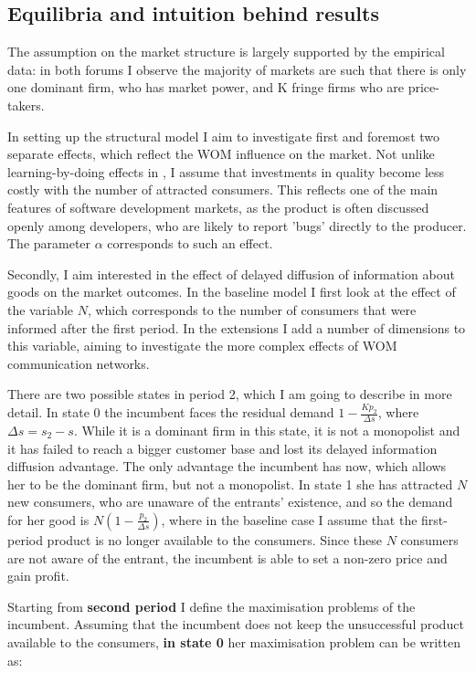 \documentclass{article}
\numberwithin{figure}{section}
\numberwithin{table}{section}
\theoremstyle{indented}
\numberwithin{equation}{section} %
\begin{document}
\subsection{Equilibria and intuition behind results}

The assumption on the market structure is largely supported by the empirical data: in both forums I observe the majority of markets are such that there is only one dominant firm, who has market power, and K fringe firms who are price-takers. 

In setting up the structural model I aim to investigate first and foremost two separate effects, which reflect the WOM influence on the market. Not unlike learning-by-doing effects in \citet{Tirole}, I assume that investments in quality become less costly with the number of attracted consumers. This reflects one of the main features of software development markets, as the product is often discussed openly among developers, who are likely to report 'bugs' directly to the producer. The parameter $\alpha$ corresponds to such an effect. 
 
Secondly, I aim interested in the effect of delayed diffusion of information about goods on the market outcomes. In the baseline model I first look at the effect of the variable $N$, which corresponds to the number of consumers that were informed after the first period. In the extensions I add a number of dimensions to this variable, aiming to investigate the more complex effects of WOM communication networks.

There are two possible states in period 2, which I am going to describe in more detail. In state 0 the incumbent faces the residual demand $1-\tfrac{Kp_2}{\Delta s}$, where $\Delta s = s_2-s$. While it is a dominant firm in this state, it is not a monopolist and it has failed to reach a bigger customer base and lost its delayed information diffusion advantage. The only advantage the incumbent has now, which allows her to be the dominant firm, but not a monopolist.   In state 1 she has attracted $N$ new consumers, who are unaware of the entrants' existence, and so the demand for her good is  $N(1-\tfrac{p_2}{\Delta s})$, where in the baseline case I assume that the first-period product is no longer available to the consumers. Since these $N$ consumers are not aware of the entrant, the incumbent is able to set a non-zero price and gain profit.


Starting from \textbf{second period} I define the maximisation problems of the incumbent. 
Assuming that the incumbent does not keep the unsuccessful product available to the consumers, \textbf{in state 0} her maximisation problem can be written as:
\end{document}
